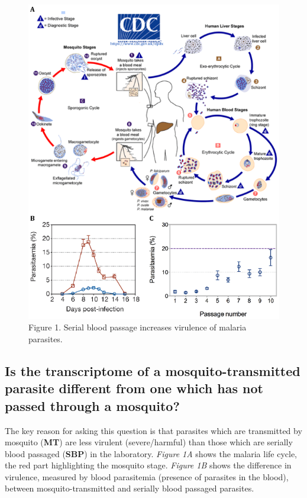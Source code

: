 \documentclass[11pt]{article}
\begin{document}
    \begin{figure}[!h]
\centering
\includegraphics{images/background-spence2013.png}
\caption{Figure 1. Serial blood passage increases virulence of malaria
parasites.}
\end{figure}

    \hypertarget{is-the-transcriptome-of-a-mosquito-transmitted-parasite-different-from-one-which-has-not-passed-through-a-mosquito}{%
\subsection{Is the transcriptome of a mosquito-transmitted parasite
different from one which has not passed through a
mosquito?}\label{is-the-transcriptome-of-a-mosquito-transmitted-parasite-different-from-one-which-has-not-passed-through-a-mosquito}}

    The key reason for asking this question is that parasites which are
transmitted by mosquito (\textbf{MT}) are less virulent (severe/harmful)
than those which are serially blood passaged (\textbf{SBP}) in the
laboratory. \textit{Figure 1A} shows the malaria life cycle, the red part
highlighting the mosquito stage. \textit{Figure 1B} shows the difference
in virulence, measured by blood parasitemia (presence of parasites in
the blood), between mosquito-transmitted and serially blood passaged
parasites.
\end{document}
